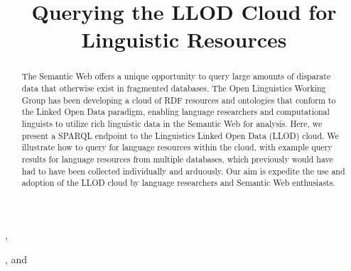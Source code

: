\documentclass{iosart2c}
\begin{document}
\begin{frontmatter}                           %

\title{Querying the LLOD Cloud for Linguistic Resources%
} 



\author[A,B]{ },
\author[C,D]{ },
and
\author[E]{ }


\address[A]{Department of Intelligent Computer Systems, University of Malta, Msida, MSD2080, Malta}
\address[B]{Computational Linguistics Department, Saarland University, Saarbr\"ucken, 66121, Germany\\  E-mail: littauer@coli.uni-saarland.de}
\address[C]{Department of Linguistics, University of Z\"urich, Plattenstrasse 54, CH-8032 Z\"urich, Switzerland} 
\address[D]{Research Unit Quantitative Language Comparison, Ludwig Maximilian University, Geschwister Scholl Platz 1, D-80539 Munich, Germany\\ 
E-mail: steve.moran@lmu.de}
\address[E]{Intelligent Software Components, iSOCO, S.A., Av. del Partenon 16-18, Madrid, Spain\\
E-mail: bvillazon@isoco.com}

\begin{abstract}
The Semantic Web offers a unique opportunity to query large amounts of disparate data that otherwise exist in fragmented databases. The Open Linguistics Working Group has been developing a cloud of RDF resources and ontologies that conform to the Linked Open Data paradigm, enabling language researchers and computational linguists to utilize rich linguistic data in the Semantic Web for analysis. Here, we present a SPARQL endpoint to the Linguistics Linked Open Data (LLOD) cloud. We illustrate how to query for language resources within the cloud, with example query results for language resources from multiple databases, which previously would have had to have been collected individually and arduously. Our aim is expedite the use and adoption of the LLOD cloud by language researchers and Semantic Web enthusiasts.


\end{abstract}
\end{frontmatter}
\end{document}
